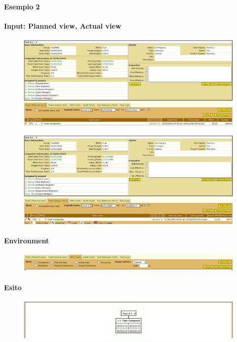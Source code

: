 \paragraph{Esempio 2}
\paragraph{Input: Planned view, Actual view}
\begin{figure}[h!]
\centering
\includegraphics[width=\textwidth]{tests/TEST_WBS/4.1/4.1_3/Esempio_2/input.png}
\end{figure}
\begin{figure}[h!]
\centering
\includegraphics[width=\textwidth]{tests/TEST_WBS/4.1/4.1_3/Esempio_2/input_actual.png}
\end{figure}
\newpage

\paragraph{Environment}
\begin{figure}[h!]
\centering
\includegraphics[width=\textwidth]{tests/TEST_WBS/4.1/4.1_3/Esempio_2/environment.png}
\end{figure}

\paragraph{Esito}
\begin{figure}[h!]
\centering
\includegraphics[width=\textwidth]{tests/TEST_WBS/4.1/4.1_3/Esempio_2/output.png}
\end{figure}
\newpage



